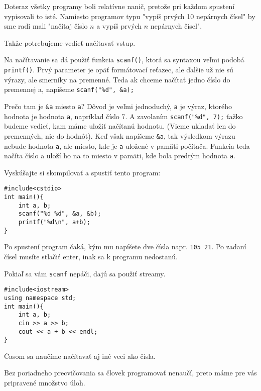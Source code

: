 
Doteraz všetky programy boli relatívne nanič, pretože pri každom spustení
vypisovali to isté.  Namiesto programov typu "vypíš prvých 10 nepárnych čísel"
by sme radi mali "načítaj číslo $n$ a vypíš prvých $n$ nepárnych čísel".

Takže potrebujeme vedieť načítavať vstup.

Na načítavanie sa dá použiť funkcia \verb!scanf()!, ktorá sa syntaxou veľmi
podobá \verb!printf()!. Prvý parameter je opäť formátovací reťazec, ale ďalšie
už nie sú výrazy, ale smerníky na premenné. Teda ak chceme načítať jedno číslo
do premennej a, napíšeme \verb!scanf("%d", &a);!

Prečo tam je \verb!&a! miesto \verb!a!? Dôvod je veľmi jednoduchý, \verb!a! je
výraz, ktorého hodnota je hodnota \verb!a!, napríklad číslo 7. A zavolaním
\verb!scanf("%d", 7);! ťažko budeme vedieť, kam máme uložiť načítanú hodnotu.
(Vieme ukladať len do premenných, nie do hodnôt). Keď však napíšeme \verb!&a!,
tak výsledkom výrazu nebude hodnota \verb!a!, ale miesto, kde je \verb!a!
uložené v pamäti počítača.  Funkcia teda načíta číslo a uloží ho na to miesto v
pamäti, kde bola predtým hodnota \verb!a!.

Vyskúšajte si skompilovať a spustiť tento program:
\begin{lstlisting}
#include<cstdio>
int main(){
    int a, b;
    scanf("%d %d", &a, &b);
    printf("%d\n", a+b);
}
\end{lstlisting}

Po spustení program čaká, kým mu napíšete dve čísla napr. \verb"105 21". Po
zadaní čísel musíte stlačiť enter, inak sa k programu nedostanú. 

Pokiaľ sa vám \verb!scanf! nepáči, dajú sa použiť streamy.
\begin{lstlisting}
#include<iostream>
using namespace std;
int main(){
    int a, b;
    cin >> a >> b;
    cout << a + b << endl;
}
\end{lstlisting}

Časom sa naučíme načítavať aj iné veci ako čísla.


Bez poriadneho precvičovania sa človek programovať nenaučí, preto máme pre vás
pripravené množstvo úloh. 

